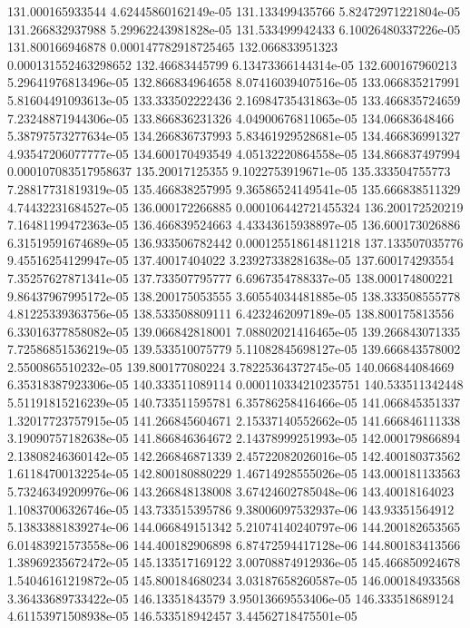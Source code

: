 {131.000165933544 4.62445860162149e-05
131.133499435766 5.82472971221804e-05
131.266832937988 5.29962243981828e-05
131.533499942433 6.10026480337226e-05
131.800166946878 0.000147782918725465
132.066833951323 0.000131552463298652
132.46683445799 6.13473366144314e-05
132.600167960213 5.29641976813496e-05
132.866834964658 8.07416039407516e-05
133.066835217991 5.81604491093613e-05
133.333502222436 2.16984735431863e-05
133.466835724659 7.23248871944306e-05
133.866836231326 4.04900676811065e-05
134.06683648466 5.38797573277634e-05
134.266836737993 5.83461929528681e-05
134.466836991327 4.93547206077777e-05
134.600170493549 4.05132220864558e-05
134.866837497994 0.000107083517958637
135.20017125355 9.1022753919671e-05
135.333504755773 7.28817731819319e-05
135.466838257995 9.36586524149541e-05
135.666838511329 4.74432231684527e-05
136.000172266885 0.000106442721455324
136.200172520219 7.16481199472363e-05
136.466839524663 4.43343615938897e-05
136.600173026886 6.31519591674689e-05
136.933506782442 0.000125518614811218
137.133507035776 9.45516254129947e-05
137.40017404022 3.23927338281638e-05
137.600174293554 7.35257627871341e-05
137.733507795777 6.6967354788337e-05
138.000174800221 9.86437967995172e-05
138.200175053555 3.60554034481885e-05
138.333508555778 4.81225339363756e-05
138.533508809111 6.4232462097189e-05
138.800175813556 6.33016377858082e-05
139.066842818001 7.08802021416465e-05
139.266843071335 7.72586851536219e-05
139.533510075779 5.11082845698127e-05
139.666843578002 2.5500865510232e-05
139.800177080224 3.78225364372745e-05
140.066844084669 6.35318387923306e-05
140.333511089114 0.000110334210235751
140.533511342448 5.51191815216239e-05
140.733511595781 6.35786258416466e-05
141.066845351337 1.32017723757915e-05
141.266845604671 2.15337140552662e-05
141.666846111338 3.19090757182638e-05
141.866846364672 2.14378999251993e-05
142.000179866894 2.13808246360142e-05
142.266846871339 2.45722082026016e-05
142.400180373562 1.61184700132254e-05
142.800180880229 1.46714928555026e-05
143.000181133563 5.73246349209976e-06
143.266848138008 3.67424602785048e-06
143.40018164023 1.10837006326746e-05
143.733515395786 9.38006097532937e-06
143.93351564912 5.13833881839274e-06
144.066849151342 5.21074140240797e-06
144.200182653565 6.01483921573558e-06
144.400182906898 6.87472594417128e-06
144.800183413566 1.38969235672472e-05
145.133517169122 3.00708874912936e-05
145.466850924678 1.54046161219872e-05
145.800184680234 3.03187658260587e-05
146.000184933568 3.36433689733422e-05
146.13351843579 3.95013669553406e-05
146.333518689124 4.61153971508938e-05
146.533518942457 3.44562718475501e-05
}
